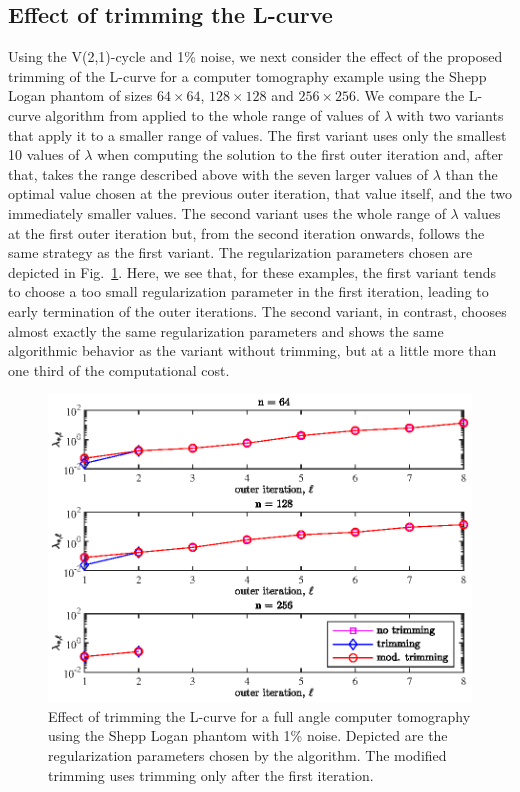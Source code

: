 \subsection{Effect of trimming the L-curve}
\label{ssec:trimming_numerical}
Using the V(2,1)-cycle and 1\% noise, we next consider the effect of the proposed trimming of the L-curve for a computer tomography example using the Shepp Logan phantom of sizes $64 \times 64$, $128 \times 128$ and $256 \times 256$. We compare the L-curve algorithm from \cite{OlearyHansen} applied to the whole range of values of $\lambda$ with two variants that apply it to a smaller range of values. The first variant uses only the smallest 10 values of $\lambda$ when computing the solution to the first outer iteration and, after that, takes the range described above with the seven larger values of $\lambda$ than the optimal value chosen at the previous outer iteration, that value itself, and the two immediately smaller values. The second variant uses the whole range of $\lambda$ values at the first outer iteration but, from the second iteration onwards, follows the same strategy as the first variant. The regularization parameters chosen are depicted in Fig.~\ref{fig:L-Curve_trimming}. Here, we see that, for these examples, the first variant tends to choose a too small regularization parameter in the first iteration, leading to early termination of the outer iterations. The second variant, in contrast, chooses almost exactly the same regularization parameters and shows the same algorithmic behavior as the variant without trimming, but at a little more than one third of the computational cost.
\begin{figure}[htbp]
\begin{center}
\includegraphics{figures/L-Curve_trimming}
\caption{Effect of trimming the L-curve for a full angle computer tomography using the Shepp Logan phantom with 1\% noise. Depicted are the regularization parameters chosen by the algorithm. The modified trimming uses trimming only after the first iteration.}
\label{fig:L-Curve_trimming}
\end{center}
\end{figure}

